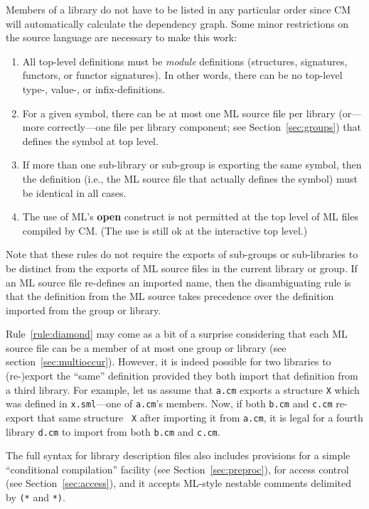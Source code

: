 \documentclass[titlepage,letterpaper]{article}
\begin{document}
Members of a library do not have to be listed in any particular order
since CM will automatically calculate the dependency graph.  Some
minor restrictions on the source language are necessary to make this
work:
\begin{enumerate}
\item All top-level definitions must be {\em module} definitions
(structures, signatures, functors, or functor signatures).  In other
words, there can be no top-level type-, value-, or infix-definitions.
\item For a given symbol, there can be at most one ML source file per
library (or---more correctly---one file per library component; see
Section~\ref{sec:groups}) that defines the symbol at top level.
\item If more than one sub-library or sub-group is exporting the same
symbol, then the definition (i.e., the ML source file that actually
defines the symbol) must be identical in all cases.
\label{rule:diamond}
\item The use of ML's {\bf open} construct is not permitted at the top
level of ML files compiled by CM.  (The use is still ok at the
interactive top level.)
\end{enumerate}

Note that these rules do not require the exports of sub-groups or
sub-libraries to be distinct from the exports of ML source files in
the current library or group.  If an ML source file re-defines an
imported name, then the disambiguating rule is that the definition
from the ML source takes precedence over the definition imported from
the group or library.

Rule~\ref{rule:diamond} may come as a bit of a surprise considering
that each ML source file can be a member of at most one group or
library (see section~\ref{sec:multioccur}).  However, it is indeed
possible for two libraries to (re-)export the ``same'' definition
provided they both import that definition from a third library.  For
example, let us assume that {\tt a.cm} exports a structure {\tt X}
which was defined in {\tt x.sml}---one of {\tt a.cm}'s members.  Now,
if both {\tt b.cm} and {\tt c.cm} re-export that same structure {\tt
X} after importing it from {\tt a.cm}, it is legal for a fourth
library {\tt d.cm} to import from both {\tt b.cm} and {\tt c.cm}.

The full syntax for library description files also includes provisions
for a simple ``conditional compilation'' facility (see
Section~\ref{sec:preproc}), for access control (see
Section~\ref{sec:access}), and it accepts ML-style nestable comments
delimited by \verb|(*| and \verb|*)|.
\end{document}
